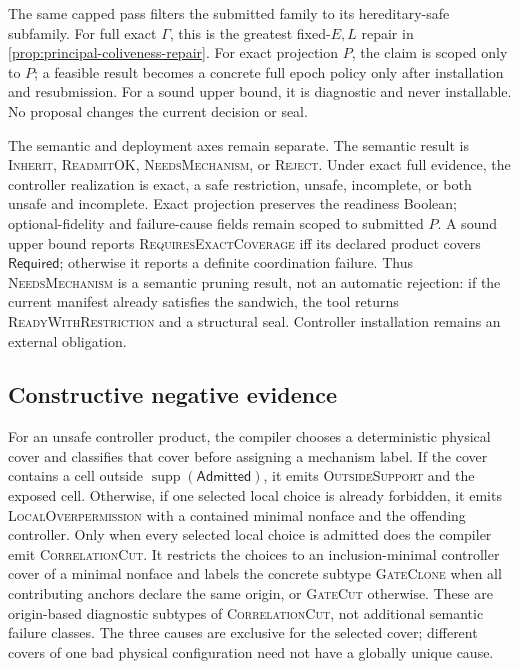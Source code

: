 The same capped pass filters the submitted family to its hereditary-safe
subfamily.  For full exact $\Gamma$, this is the greatest fixed-$E,L$ repair in
\cref{prop:principal-coliveness-repair}.  For exact projection $P$, the claim
is scoped only to $P$; a feasible result becomes a concrete full epoch policy
only after installation and resubmission.  For a sound upper bound, it is
diagnostic and never installable.  No proposal changes the current decision or
seal.

The semantic and deployment axes remain separate.
The semantic result is \textsc{Inherit}, \textsc{ReadmitOK},
\textsc{NeedsMechanism}, or \textsc{Reject}.
Under exact full evidence, the controller realization is exact, a safe
restriction, unsafe, incomplete, or both unsafe and incomplete.  Exact
projection preserves the readiness Boolean; optional-fidelity and failure-cause
fields remain scoped to submitted $P$.  A sound upper bound reports
\textsc{RequiresExactCoverage} iff its declared product covers
$\mathsf{Required}$; otherwise it reports a definite coordination failure.
Thus \textsc{NeedsMechanism} is a
semantic pruning result, not an automatic rejection: if the current manifest
already satisfies the sandwich, the tool returns \textsc{ReadyWithRestriction}
and a structural seal.  Controller installation remains an external obligation.

\subsection{Constructive negative evidence}

For an unsafe controller product, the compiler chooses a deterministic
physical cover and classifies that cover before assigning a mechanism label.
If the cover contains a cell outside
$\operatorname{supp}(\mathsf{Admitted})$, it emits
\textsc{OutsideSupport} and the exposed cell.
Otherwise, if one selected local choice is already forbidden, it emits
\textsc{LocalOverpermission} with a contained minimal nonface and the
offending controller.
Only when every selected local choice is admitted does the compiler emit
\textsc{CorrelationCut}.
It restricts the choices to an inclusion-minimal controller cover of a
minimal nonface and labels the concrete subtype \textsc{GateClone} when all
contributing anchors declare the same origin, or \textsc{GateCut} otherwise.
These are origin-based diagnostic subtypes of \textsc{CorrelationCut}, not
additional semantic failure classes.
The three causes are exclusive for the selected cover; different covers of
one bad physical configuration need not have a globally unique cause.

